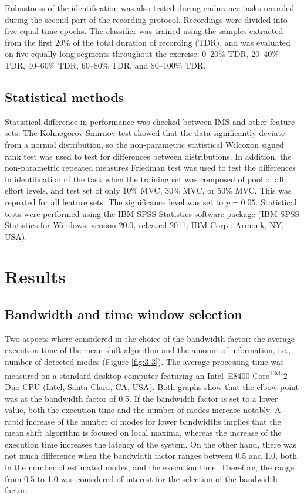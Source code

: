 Robustness of the identification was also tested during endurance tasks recorded during the second part of the recording protocol. Recordings were divided into five equal time epochs. The classifier was trained using the samples extracted from the first 20\% of the total duration of recording (TDR), and was evaluated on five equally long segments throughout the exercise: 0–20\% TDR, 20–40\% TDR, 40–60\% TDR, 60–80\% TDR, and 80–100\% TDR.


\subsection{Statistical methods}
Statistical difference in performance was checked between IMS and other feature sets. The Kolmogorov-Smirnov test showed that the data significantly deviate from a normal distribution, so the non-parametric statistical Wilcoxon signed rank test was used to test for differences between distributions. In addition, the non-parametric repeated measures Friedman test was used to test the differences in identification of the task when the training set was composed of pool of all effort levels, and test set of only 10\% MVC, 30\% MVC, or 50\% MVC. This was repeated for all feature sets. The significance level was set to $p = 0.05$. Statistical tests were performed using the IBM SPSS Statistics software package (IBM SPSS Statistics for Windows, version 20.0, released 2011; IBM Corp.: Armonk, NY, USA).
\clearpage


\section{Results} \label{sc:3-3}
\subsection{Bandwidth and time window selection}
Two aspects where considered in the choice of the bandwidth factor: the average execution time of the mean shift algorithm and the amount of information, i.e., number of detected modes (Figure \ref{fig:3-3}). The average processing time was measured on a standard desktop computer featuring an Intel\textregistered \, E8400 Core\textsuperscript{TM} 2 Duo CPU (Intel, Santa Clara, CA, USA). Both graphs show that the elbow point was at the bandwidth factor of 0.5. If the bandwidth factor is set to a lower value, both the execution time and the number of modes increase notably. A rapid increase of the number of modes for lower bandwidths implies that the mean shift algorithm is focused on local maxima, whereas the increase of the execution time increases the latency of the system. On the other hand, there was not much difference when the bandwidth factor ranges between 0.5 and 1.0, both in the number of estimated modes, and the execution time. Therefore, the range from 0.5 to 1.0 was considered of interest for the selection of the bandwidth factor.

